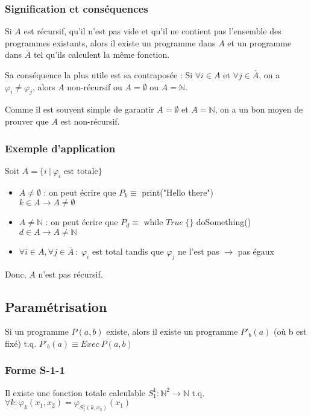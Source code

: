 \subsubsection{Signification et conséquences}

Si $A$ est récursif, qu'il n'est pas vide et qu'il ne contient pas l'ensemble des programmes existants, alors il existe un programme dans $A$ et un programme dans $\bar{A}$ tel qu'ils calculent la même fonction.

Sa conséquence la plus utile est sa contraposée : Si $\forall i \in A$ et $\forall j \in \bar{A}$, on a $\varphi_i \neq \varphi_j$, alors $A$ non-récursif ou $A = \emptyset$ ou $A = \mathbb{N}$.

Comme il est souvent simple de garantir $A = \emptyset$ et $A = \mathbb{N}$, on a un bon moyen de prouver que $A$ est non-récursif.

\subsubsection{Exemple d'application}

Soit $A = \{i \ |\ \varphi_i \text{ est totale}\}$
\begin{itemize}
\item $A \neq \emptyset$ : on peut écrire que $P_k \equiv$ print("Hello there")\\
	$k \in A \rightarrow A \neq \emptyset$
\item $A \neq \mathbb{N}$ : on peut écrire que $P_d \equiv$ while $True \ \{\}$ doSomething()
	$d \in A \rightarrow A \neq \mathbb{N}$
\item $\forall i \in A, \forall j \in \bar{A}\ :\ \varphi_i$ est total tandis que $\varphi_j$ ne l'est pas $\rightarrow$ pas égaux
\end{itemize}
Donc, $A$ n'est pas récursif.

\subsection{Paramétrisation}

Si un programme $P(a,b)$ existe, alors il existe un programme $P'_b(a)$ (où b est fixé) t.q. $P'_b(a) \equiv Exec \ P(a,b)$

\subsubsection{Forme S-1-1}

Il existe une fonction totale calculable $S^1_1 : \mathbb{N}^2 \rightarrow \mathbb{N}$ t.q. $\forall k : \varphi_k(x_1, x_2) = \varphi_{S^1_1(k,x_2)}(x_1)$

